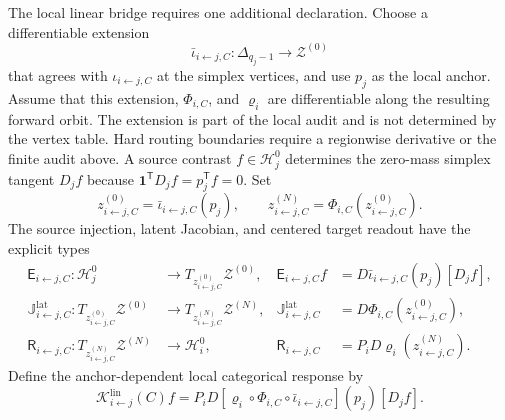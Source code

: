 \documentclass[10pt]{article}
\theoremstyle{definition}
\theoremstyle{remark}
\begin{document}
The local linear bridge requires one additional declaration.  Choose a differentiable extension
\begin{equation}
\bar\iota_{i\leftarrow j,C}:\Delta_{q_j-1}\longrightarrow\mathscr Z^{(0)}
\label{eq:differentiable-categorical-extension}
\end{equation}
that agrees with $\iota_{i\leftarrow j,C}$ at the simplex vertices, and use $p_j$ as the local
anchor.  Assume that this extension, $\Phi_{i,C}$, and $\varrho_i$ are differentiable along the
resulting forward orbit.  The extension is part of the local audit and is not determined by the
vertex table.  Hard routing boundaries require a regionwise derivative or the finite audit above.
A source contrast $f\in\mathcal H_j^0$ determines the zero-mass simplex tangent $D_jf$ because
$\mathbf1^{\mathsf T}D_jf=p_j^{\mathsf T}f=0$.  Set
\begin{equation}
z_{i\leftarrow j,C}^{(0)}
=\bar\iota_{i\leftarrow j,C}(p_j),
\qquad
z_{i\leftarrow j,C}^{(N)}
=\Phi_{i,C}(z_{i\leftarrow j,C}^{(0)}).
\label{eq:etr-anchor-states}
\end{equation}
The source injection, latent Jacobian, and centered target readout have the explicit types
\begin{align}
\mathsf E_{i\leftarrow j,C}:\mathcal H_j^0
&\longrightarrow T_{z_{i\leftarrow j,C}^{(0)}}\mathscr Z^{(0)},
&\mathsf E_{i\leftarrow j,C}f
&=D\bar\iota_{i\leftarrow j,C}(p_j)[D_jf],
\label{eq:typed-source-injection}\\
\mathbb J_{i\leftarrow j,C}^{\mathrm{lat}}:
T_{z_{i\leftarrow j,C}^{(0)}}\mathscr Z^{(0)}
&\longrightarrow T_{z_{i\leftarrow j,C}^{(N)}}\mathscr Z^{(N)},
&\mathbb J_{i\leftarrow j,C}^{\mathrm{lat}}
&=D\Phi_{i,C}(z_{i\leftarrow j,C}^{(0)}),
\label{eq:complete-latent-jacobian}\\
\mathsf R_{i\leftarrow j,C}:
T_{z_{i\leftarrow j,C}^{(N)}}\mathscr Z^{(N)}
&\longrightarrow\mathcal H_i^0,
&\mathsf R_{i\leftarrow j,C}
&=P_iD\varrho_i(z_{i\leftarrow j,C}^{(N)}).
\label{eq:centered-target-readout}
\end{align}
Define the anchor-dependent local categorical response by
\begin{equation}
\mathcal K_{i\leftarrow j}^{\mathrm{lin}}(C)f
=P_iD\!\left[
\varrho_i\circ\Phi_{i,C}\circ\bar\iota_{i\leftarrow j,C}
\right](p_j)[D_jf].
\label{eq:local-categorical-response-definition}
\end{equation}
\end{document}
